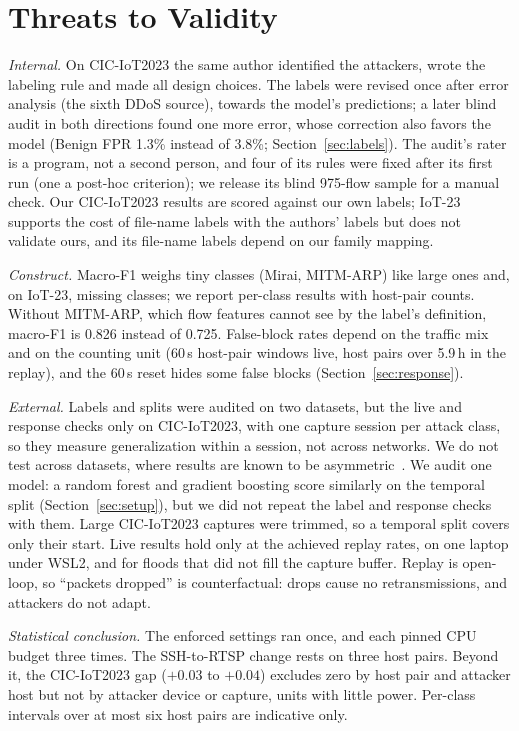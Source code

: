 \section{Threats to Validity}\label{sec:threats}

\emph{Internal.} On CIC-IoT2023 the same author identified the attackers, wrote the labeling rule and made all design choices. The labels were revised once after error analysis (the sixth DDoS source), towards the model's predictions; a later blind audit in both directions found one more error, whose correction also favors the model (Benign FPR 1.3\% instead of 3.8\%; Section~\ref{sec:labels}). The audit's rater is a program, not a second person, and four of its rules were fixed after its first run (one a post-hoc criterion); we release its blind 975-flow sample for a manual check. Our CIC-IoT2023 results are scored against our own labels; IoT-23 supports the cost of file-name labels with the authors' labels but does not validate ours, and its file-name labels depend on our family mapping.

\emph{Construct.} Macro-F1 weighs tiny classes (Mirai, MITM-ARP) like large ones and, on IoT-23, missing classes; we report per-class results with host-pair counts. Without MITM-ARP, which flow features cannot see by the label's definition, macro-F1 is 0.826 instead of 0.725. False-block rates depend on the traffic mix and on the counting unit (60\,s host-pair windows live, host pairs over 5.9\,h in the replay), and the 60\,s reset hides some false blocks (Section~\ref{sec:response}).

\emph{External.} Labels and splits were audited on two datasets, but the live and response checks only on CIC-IoT2023, with one capture session per attack class, so they measure generalization within a session, not across networks. We do not test across datasets, where results are known to be asymmetric~\cite{ali2026siamxbert}. We audit one model: a random forest and gradient boosting score similarly on the temporal split (Section~\ref{sec:setup}), but we did not repeat the label and response checks with them. Large CIC-IoT2023 captures were trimmed, so a temporal split covers only their start. Live results hold only at the achieved replay rates, on one laptop under WSL2, and for floods that did not fill the capture buffer. Replay is open-loop, so ``packets dropped'' is counterfactual: drops cause no retransmissions, and attackers do not adapt.

\emph{Statistical conclusion.} The enforced settings ran once, and each pinned CPU budget three times. The SSH-to-RTSP change rests on three host pairs. Beyond it, the CIC-IoT2023 gap ($+0.03$ to $+0.04$) excludes zero by host pair and attacker host but not by attacker device or capture, units with little power. Per-class intervals over at most six host pairs are indicative only.

